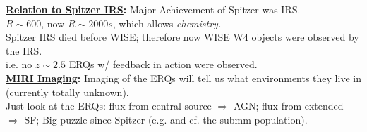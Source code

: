 \medskip
\medskip
\smallskip
\smallskip
\noindent
{\bf \underline{Relation to Spitzer IRS}:}
Major Achievement of Spitzer was IRS. \\
$R\sim600$, now $R\sim2000s$, which allows {\it chemistry.}\\
Spitzer IRS died before WISE; therefore now WISE W4 objects were observed by the IRS.\\
i.e. no $z\sim2.5$ ERQs w/ feedback in action were observed. \\

\medskip
\medskip
\smallskip
\smallskip
\noindent
{\bf \underline{MIRI Imaging}:}
Imaging of the ERQs will tell us what environments they live in (currently totally unknown).\\
Just look at the ERQs: flux from central source $\Rightarrow$ AGN; flux from extended 
$\Rightarrow$ SF; Big puzzle since Spitzer (e.g. and cf. the submm population). \\
